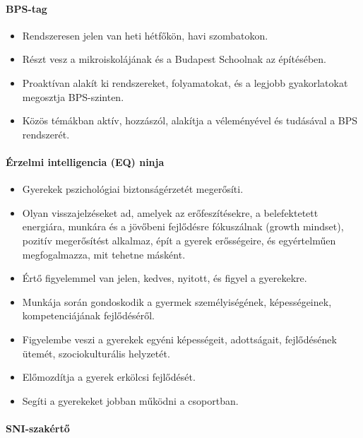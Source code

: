\paragraph{BPS-tag}

\begin{itemize}

    \item
          Rendszeresen jelen van heti hétfőkön, havi szombatokon.
    \item
          Részt vesz a mikroiskolájának és a Budapest Schoolnak az építésében.
    \item
          Proaktívan alakít ki rendszereket, folyamatokat, és a legjobb gyakorlatokat megosztja BPS-szinten.
    \item
          Közös témákban aktív, hozzászól, alakítja a véleményével és tudásával a BPS rendszerét.
\end{itemize}

\paragraph{Érzelmi intelligencia (EQ) ninja}

\begin{itemize}

    \item
          Gyerekek pszichológiai biztonságérzetét megerősíti.
    \item
          Olyan visszajelzéseket ad, amelyek az erőfeszítésekre, a belefektetett energiára, munkára és a jövőbeni fejlődésre fókuszálnak (growth mindset), pozitív megerősítést alkalmaz, épít a gyerek erősségeire, és egyértelműen megfogalmazza, mit tehetne másként.
    \item
          Értő figyelemmel van jelen, kedves, nyitott, és figyel a gyerekekre.
    \item Munkája során gondoskodik a gyermek személyiségének, képességeinek, kompetenciájának fejlődéséről.
    \item Figyelembe veszi a gyerekek egyéni képességeit, adottságait, fejlődésének ütemét, szociokulturális helyzetét.
    \item Előmozdítja a gyerek erkölcsi fejlődését.
    \item Segíti a gyerekeket jobban működni a csoportban.

\end{itemize}

\paragraph{SNI-szakértő}

